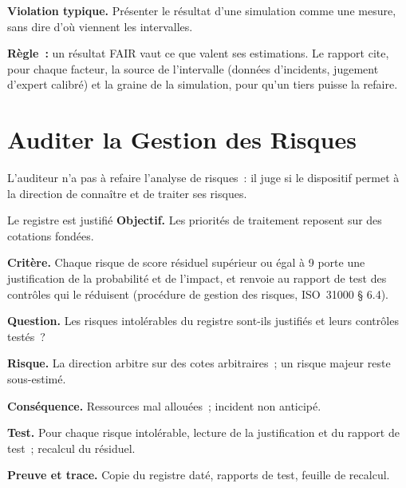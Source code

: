 \begin{boxalert}
\textbf{Violation typique.} Présenter le résultat d'une simulation comme une
mesure, sans dire d'où viennent les intervalles.

\smallskip
\textbf{Règle~:} un résultat FAIR vaut ce que valent ses estimations. Le
rapport cite, pour chaque facteur, la source de l'intervalle (données
d'incidents, jugement d'expert calibré) et la graine de la simulation, pour
qu'un tiers puisse la refaire.
\end{boxalert}

\section{Auditer la Gestion des Risques}
\label{sec:c05-auditer}

L'auditeur n'a pas à refaire l'analyse de risques~: il juge si le dispositif
permet à la direction de connaître et de traiter ses risques.

\begin{boxobjet}{Le registre est justifié}
\textbf{Objectif.} Les priorités de traitement reposent sur des cotations
fondées.

\textbf{Critère.} Chaque risque de score résiduel supérieur ou égal à 9
porte une justification de la probabilité et de l'impact, et renvoie au
rapport de test des contrôles qui le réduisent (procédure de gestion des
risques, ISO~31000 § 6.4).

\textbf{Question.} Les risques intolérables du registre sont-ils justifiés
et leurs contrôles testés~?

\textbf{Risque.} La direction arbitre sur des cotes arbitraires~; un risque
majeur reste sous-estimé.

\textbf{Conséquence.} Ressources mal allouées~; incident non anticipé.

\textbf{Test.} Pour chaque risque intolérable, lecture de la justification
et du rapport de test~; recalcul du résiduel.

\textbf{Preuve et trace.} Copie du registre daté, rapports de test,
feuille de recalcul.
\end{boxobjet}

